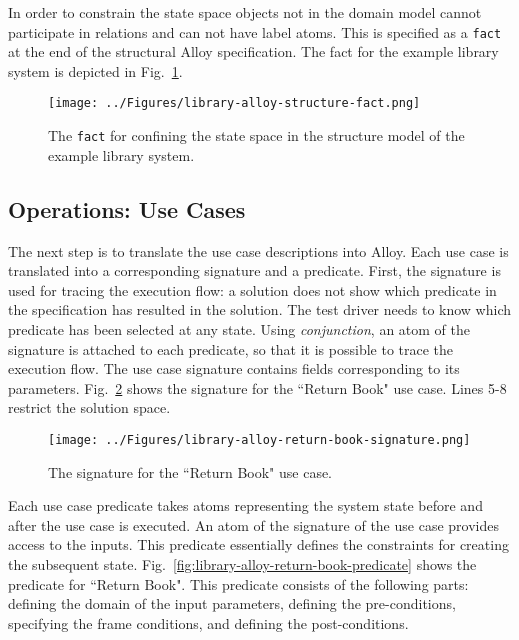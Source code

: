 In order to constrain the state space objects not in the domain model cannot participate in relations and can not have label atoms. This is specified as a \texttt{fact} at the end of the structural Alloy specification. The fact for the example library system is depicted in Fig.~\ref{fig:library-alloy-structure-fact}.

\begin{figure}[h]
\centering
\texttt{[image: ../Figures/library-alloy-structure-fact.png]}
\caption{The \texttt{fact} for confining the state space in the structure model of the example library system.}
\label{fig:library-alloy-structure-fact}
\end{figure}


\subsection{Operations: Use Cases}
\label{sec:alloy-usecases}
The next step is to translate the use case descriptions into Alloy. Each use case is translated into a corresponding signature and a predicate. First, the signature is used for tracing the execution flow: a solution does not show which predicate in the specification has resulted in the solution. The test driver needs to know which predicate has been selected at any state. Using \textit{conjunction}, an atom of the signature is attached to each predicate, so that it is possible to trace the execution flow. The use case signature contains fields corresponding to its parameters. Fig.~\ref{fig:library-alloy-return-book-signature} shows the signature for the ``Return Book" use case. Lines 5-8 restrict the solution space.

\begin{figure}[h]
\centering
\texttt{[image: ../Figures/library-alloy-return-book-signature.png]}
\caption{The signature for the ``Return Book" use case.}
\label{fig:library-alloy-return-book-signature}
\end{figure}

Each use case predicate takes atoms representing the system state before and after the use case is executed. An atom of the signature of the use case provides access to the inputs. This predicate essentially defines the constraints for creating the subsequent state. Fig.~\ref{fig:library-alloy-return-book-predicate} shows the predicate for ``Return Book". This predicate consists of the following parts: defining the domain of the input parameters, defining the pre-conditions, specifying the frame conditions, and defining the post-conditions.

